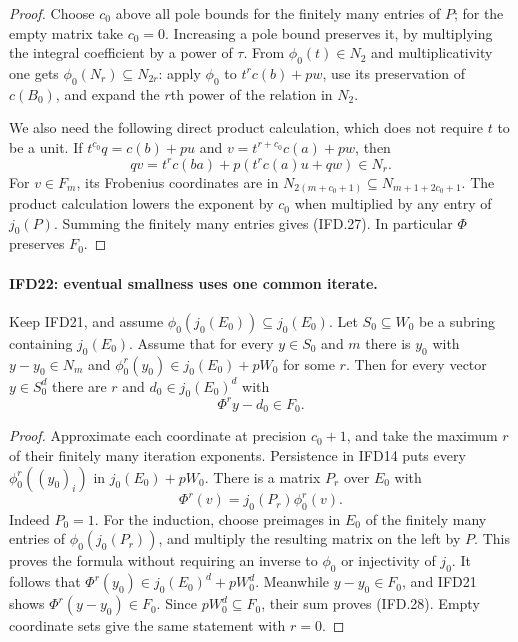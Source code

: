 \documentclass[11pt,a4paper]{article}
\numberwithin{equation}{section}
\theoremstyle{remark}\newtheorem{remark}[theorem]{Remark}
\begin{document}
\begin{proof}
Choose $c_0$ above all pole bounds for the finitely many entries
of $P$; for the empty matrix take $c_0=0$.
Increasing a pole bound preserves it, by multiplying the integral
coefficient by a power of $\tau$.
From $\phi_0(t)\in N_2$ and multiplicativity one gets
$\phi_0(N_r)\subseteq N_{2r}$: apply $\phi_0$ to
$t^rc(b)+pw$, use its preservation of $c(B_0)$, and expand the
$r$th power of the relation in $N_2$.

We also need the following direct product calculation, which does
not require $t$ to be a unit. If $t^{c_0}q=c(b)+pu$ and
$v=t^{r+c_0}c(a)+pw$, then
\[
                         qv=t^rc(ba)+p(t^rc(a)u+qw)\in N_r.
\]
For $v\in F_m$, its Frobenius coordinates are in
$N_{2(m+c_0+1)}\subseteq N_{m+1+2c_0+1}$.
The product calculation lowers the exponent by $c_0$ when
multiplied by any entry of $j_0(P)$. Summing the finitely many
entries gives (IFD.27). In particular $\Phi$ preserves $F_0$.
\end{proof}

\paragraph{IFD22: eventual smallness uses one common iterate.}
\label{claim:IFD22}
Keep IFD21, and assume $\phi_0(j_0(E_0))\subseteq j_0(E_0)$.
Let $S_0\subseteq W_0$ be a subring containing $j_0(E_0)$.
Assume that for every $y\in S_0$ and $m$ there is $y_0$ with
$y-y_0\in N_m$ and $\phi_0^r(y_0)\in j_0(E_0)+pW_0$ for
some $r$. Then for every vector $y\in S_0^d$ there are $r$
and $d_0\in j_0(E_0)^d$ with
\[
                              \Phi^r y-d_0\in F_0.         \tag{IFD.28}
\]

\begin{proof}
Approximate each coordinate at precision $c_0+1$, and take the
maximum $r$ of their finitely many iteration exponents.
Persistence in IFD14 puts every $\phi_0^r((y_0)_i)$ in
$j_0(E_0)+pW_0$. There is a matrix $P_r$ over $E_0$ with
\[
                              \Phi^r(v)=j_0(P_r)\phi_0^r(v).
\]
Indeed $P_0=1$. For the induction, choose preimages in $E_0$ of
the finitely many entries of $\phi_0(j_0(P_r))$, and multiply
the resulting matrix on the left by $P$. This proves the formula
without requiring an inverse to $\phi_0$ or injectivity of $j_0$.
It follows that $\Phi^r(y_0)\in j_0(E_0)^d+pW_0^d$.
Meanwhile $y-y_0\in F_0$, and IFD21 shows
$\Phi^r(y-y_0)\in F_0$. Since $pW_0^d\subseteq F_0$, their
sum proves (IFD.28). Empty coordinate sets give the same statement
with $r=0$.
\end{proof}
\end{document}
